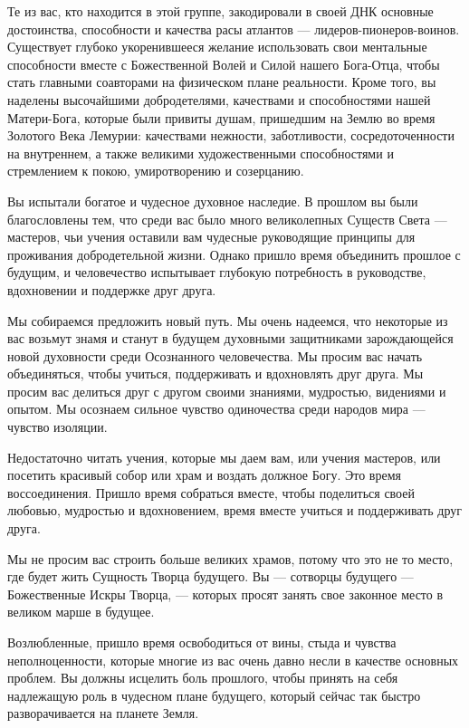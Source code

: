 Те из вас, кто находится в этой группе, закодировали в своей ДНК основные
достоинства, способности и качества расы атлантов — лидеров-пионеров-воинов.
Существует глубоко укоренившееся желание использовать свои ментальные
способности вместе с Божественной Волей и Силой нашего Бога-Отца, чтобы стать
главными соавторами на физическом плане реальности. Кроме того, вы наделены
высочайшими добродетелями, качествами и способностями нашей Матери-Бога,
которые были привиты душам, пришедшим на Землю во время Золотого Века Лемурии:
качествами нежности, заботливости, сосредоточенности на внутреннем, а также
великими художественными способностями и стремлением к покою, умиротворению и
созерцанию.

Вы испытали богатое и чудесное духовное наследие. В прошлом вы были
благословлены тем, что среди вас было много великолепных Существ Света —
мастеров, чьи учения оставили вам чудесные руководящие принципы для проживания
добродетельной жизни.  Однако пришло время объединить прошлое с будущим, и
человечество испытывает глубокую потребность в руководстве, вдохновении и
поддержке друг друга.

Мы собираемся предложить новый путь. Мы очень надеемся, что некоторые из вас
возьмут знамя и станут в будущем духовными защитниками зарождающейся новой
духовности среди Осознанного человечества. Мы просим вас начать объединяться,
чтобы учиться, поддерживать и вдохновлять друг друга. Мы просим вас делиться
друг с другом своими знаниями, мудростью, видениями и опытом. Мы осознаем
сильное чувство одиночества среди народов мира — чувство изоляции.

Недостаточно читать учения, которые мы даем вам, или учения мастеров, или
посетить красивый собор или храм и воздать должное Богу. Это время
воссоединения. Пришло время собраться вместе, чтобы поделиться своей любовью,
мудростью и вдохновением, время вместе учиться и поддерживать друг друга. 

Мы не просим вас строить больше великих храмов, потому что это не то место, где
будет жить Сущность Творца будущего. Вы — сотворцы будущего — Божественные
Искры Творца, — которых просят занять свое законное место в великом марше в
будущее.

Возлюбленные, пришло время освободиться от вины, стыда и чувства
неполноценности, которые многие из вас очень давно несли в качестве основных
проблем. Вы должны исцелить боль прошлого, чтобы принять на себя надлежащую
роль в чудесном плане будущего, который сейчас так быстро разворачивается на
планете Земля.

